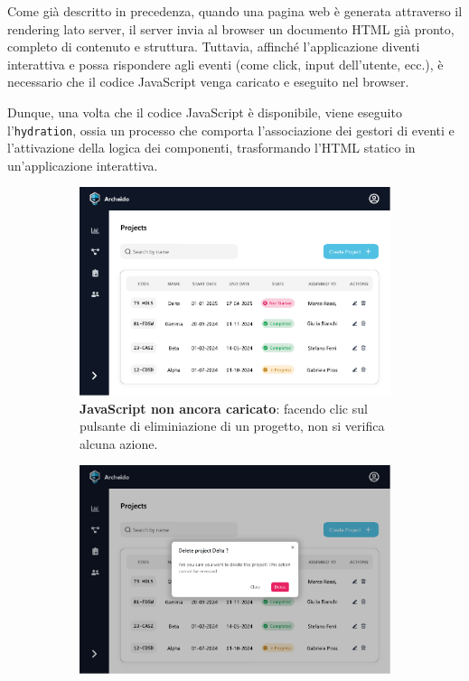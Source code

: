 \documentclass[target=bach,aauheader=,style=]{thud}
\begin{document}
\noindent Come già descritto in precedenza, quando una pagina web è generata attraverso il rendering lato server, il server invia al browser un documento HTML già pronto, completo di contenuto e struttura. Tuttavia, affinché l'applicazione diventi interattiva e possa rispondere agli eventi (come click, input dell'utente, ecc.), è necessario che il codice JavaScript venga caricato e eseguito nel browser. 

\noindent Dunque, una volta che il codice JavaScript è disponibile, viene eseguito l'\texttt{hydration}, ossia un processo che comporta l'associazione dei gestori di eventi e l'attivazione della logica dei componenti, trasformando l'HTML statico in un'applicazione interattiva.

\begin{figure}[H]
    \centering
    \begin{subfigure}[b]{0.46\textwidth}
        \centering
        \includegraphics[width=\textwidth]{img/hydration/hydration1.pdf}
        \caption{\textbf{JavaScript non ancora caricato}: facendo clic sul pulsante di eliminiazione di un progetto, non si verifica alcuna azione.}
        \label{fig:img1}
    \end{subfigure}
    \hfill
    \begin{subfigure}[b]{0.46\textwidth}
        \centering
        \includegraphics[width=\textwidth]{img/hydration/hydration2.pdf}

\end{subfigure}
\end{figure}
\end{document}
